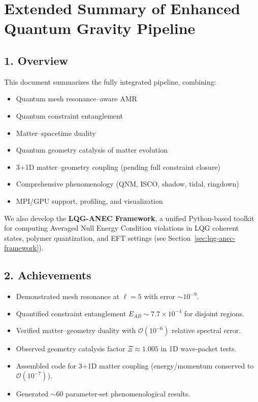 \documentclass[12pt]{article}
\begin{document}
\section*{Extended Summary of Enhanced Quantum Gravity Pipeline}

\subsection*{1. Overview}
This document summarizes the fully integrated pipeline, combining:
\begin{itemize}
  \item Quantum mesh resonance–aware AMR  
  \item Quantum constraint entanglement  
  \item Matter–spacetime duality  
  \item Quantum geometry catalysis of matter evolution  
  \item 3+1D matter–geometry coupling (pending full constraint closure)  
  \item Comprehensive phenomenology (QNM, ISCO, shadow, tidal, ringdown)  
  \item MPI/GPU support, profiling, and visualization  
\end{itemize}

We also develop the \textbf{LQG-ANEC Framework}, a unified Python-based toolkit for computing Averaged Null Energy Condition violations in LQG coherent states, polymer quantization, and EFT settings (see Section~\ref{sec:lqg-anec-framework}).

\subsection*{2. Achievements}
\begin{itemize}
  \item Demonstrated mesh resonance at $\ell=5$ with error $\sim10^{-9}$.  
  \item Quantified constraint entanglement $E_{AB}\sim7.7\times10^{-4}$ for disjoint regions.  
  \item Verified matter–geometry duality with $\mathcal{O}(10^{-6})$ relative spectral error.  
  \item Observed geometry catalysis factor $\Xi\approx1.005$ in 1D wave‐packet tests.  
  \item Assembled code for 3+1D matter coupling (energy/momentum conserved to $\mathcal{O}(10^{-7})$).  
  \item Generated $\sim60$ parameter‐set phenomenological results.  
\end{itemize}
\end{document}
